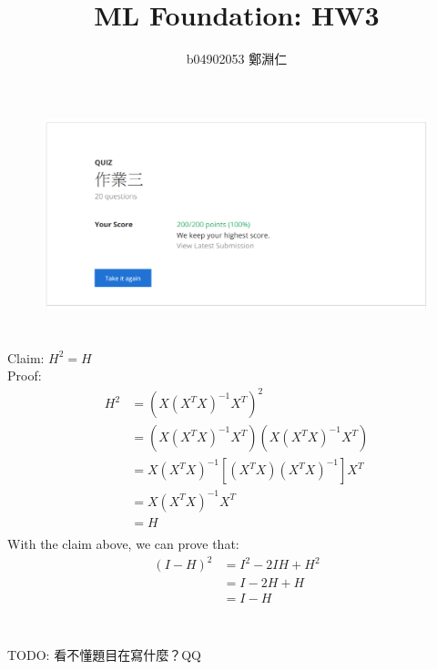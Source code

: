 \documentclass[12pt,a4paper]{article}
\title{ML Foundation: HW3}
\author{b04902053 鄭淵仁}
\begin{document}
\maketitle
\section{} %
\begin{figure}[h!]
	\centering
	\includegraphics[width=\linewidth]{code/q1.png}
\end{figure}
\section{} %
Claim: ${H}^{2} = H$ \\
Proof:
\[
	\begin{aligned}
		{H}^{2} &= {(X {({X}^{T}X)}^{-1} {X}^{T})} ^ {2} \\
				&= (X {({X}^{T}X)}^{-1} {X}^{T}) (X {({X}^{T}X)}^{-1} {X}^{T}) \\
				&= X {({X}^{T}X)}^{-1} [ ({X}^{T} X) {({X}^{T}X)}^{-1} ] {X}^{T} \\
				&= X {({X}^{T}X)}^{-1} {X}^{T} \\
				&= H \\
	\end{aligned}
\]
With the claim above, we can prove that:
\[
	\begin{aligned}
		{(I-H)}^{2} &= {I}^{2} - 2IH + {H}^{2} \\
					&= I - 2H + H \\
					&= I - H \\
	\end{aligned}
\]
\section{} %
TODO: 看不懂題目在寫什麼？QQ
\end{document}
